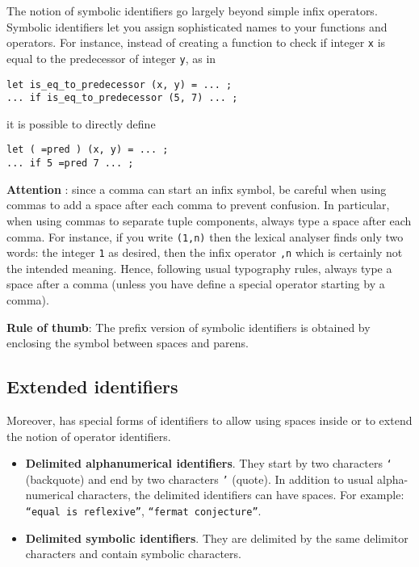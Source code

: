 The {\focal} notion of symbolic identifiers go largely beyond simple
infix operators. Symbolic identifiers let you assign sophisticated names
to your functions and operators.
For instance, instead of creating a function to check if integer {\tt x}
is equal to the predecessor of integer {\tt y}, as in
{\scriptsize
\begin{lstlisting}
let is_eq_to_predecessor (x, y) = ... ;
... if is_eq_to_predecessor (5, 7) ... ;
\end{lstlisting}
}
it is possible to directly define
{\scriptsize
\begin{lstlisting}
let ( =pred ) (x, y) = ... ;
... if 5 =pred 7 ... ;
\end{lstlisting}
}

{\bf Attention} : since a comma can start an infix symbol, be careful
when using commas to add a space after each comma to prevent confusion.
In particular, when using commas to separate tuple components, always type
a space after each comma. For instance, if you write {\tt (1,n)}
then the lexical analyser finds only two words: the integer {\tt 1} as
desired, then the infix operator {\tt ,n} which is certainly not the
intended meaning. Hence, following usual typography rules, always type a
space after a comma (unless you have define a special operator starting
by a comma).

{\bf Rule of thumb}: The prefix version of symbolic identifiers is obtained
by enclosing the symbol between spaces and parens.

\subsection{Extended identifiers}
\label{extended-identifiers}

Moreover, {\focal} has special forms of identifiers to allow using
spaces inside or to extend the notion of operator identifiers.
\begin{itemize}
  \item {\bf Delimited alphanumerical identifiers}.
    They start by two characters {\tt `} (backquote) and end by two
    characters {\tt '} (quote). In addition to usual alpha-numerical
    characters, the delimited identifiers can have spaces. For example:
    {\tt ``equal is reflexive''}, {\tt ``fermat conjecture''}.
  \item {\bf Delimited symbolic identifiers}.
    They are delimited by the same delimitor characters and contain
    symbolic characters.
\end{itemize}

